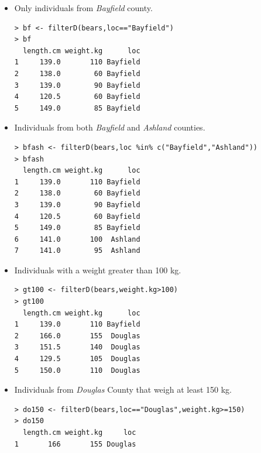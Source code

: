 \documentclass[10pt,openany]{book}\usepackage[]{graphicx}\usepackage[]{color}
\makeatletter
\newenvironment{kframe}{%
 \def\at@end@of@kframe{}%
 \ifinner\ifhmode%
  \def\at@end@of@kframe{\end{minipage}}%
  \begin{minipage}{\columnwidth}%
 \fi\fi%
 \def\FrameCommand##1{\hskip\@totalleftmargin \hskip-\fboxsep
 \colorbox{shadecolor}{##1}\hskip-\fboxsep
     \hskip-\linewidth \hskip-\@totalleftmargin \hskip\columnwidth}%
 \MakeFramed {\advance\hsize-\width
   \@totalleftmargin\z@ \linewidth\hsize
   \@setminipage}}%
 {\par\unskip\endMakeFramed%
 \at@end@of@kframe}
\newenvironment{knitrout}{}{} %
\makeatother
\begin{document}
\begin{itemize}
  \item Only individuals from \emph{Bayfield} county.
\begin{knitrout}
\color{fgcolor}\begin{kframe}
\begin{verbatim}
> bf <- filterD(bears,loc=="Bayfield")
> bf
  length.cm weight.kg      loc
1     139.0       110 Bayfield
2     138.0        60 Bayfield
3     139.0        90 Bayfield
4     120.5        60 Bayfield
5     149.0        85 Bayfield
\end{verbatim}
\end{kframe}
\end{knitrout}

  \item Individuals from both \emph{Bayfield} and \emph{Ashland} counties.
\begin{knitrout}
\color{fgcolor}\begin{kframe}
\begin{verbatim}
> bfash <- filterD(bears,loc %in% c("Bayfield","Ashland"))
> bfash
  length.cm weight.kg      loc
1     139.0       110 Bayfield
2     138.0        60 Bayfield
3     139.0        90 Bayfield
4     120.5        60 Bayfield
5     149.0        85 Bayfield
6     141.0       100  Ashland
7     141.0        95  Ashland
\end{verbatim}
\end{kframe}
\end{knitrout}

  \item Individuals with a weight greater than 100 kg.
\begin{knitrout}
\color{fgcolor}\begin{kframe}
\begin{verbatim}
> gt100 <- filterD(bears,weight.kg>100)
> gt100
  length.cm weight.kg      loc
1     139.0       110 Bayfield
2     166.0       155  Douglas
3     151.5       140  Douglas
4     129.5       105  Douglas
5     150.0       110  Douglas
\end{verbatim}
\end{kframe}
\end{knitrout}

  \item Individuals from \emph{Douglas} County that weigh at least 150 kg.
\begin{knitrout}
\color{fgcolor}\begin{kframe}
\begin{verbatim}
> do150 <- filterD(bears,loc=="Douglas",weight.kg>=150)
> do150
  length.cm weight.kg     loc
1       166       155 Douglas
\end{verbatim}
\end{kframe}
\end{knitrout}
\end{itemize}
\end{document}

